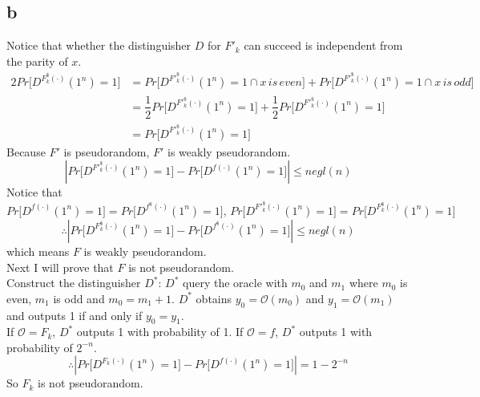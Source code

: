 \documentclass[a4papers]{ctexart}
\begin{document}
\subsection*{b}
\noindent Notice that whether the distinguisher $D$ for $F'_k$ can succeed is independent from the parity of $x$.
\begin{alignat*}{2}
    Pr\big[ D^{F^\$_k(·)}(1^n)=1\big] 
    &= Pr\big[ D^{F'^\$_k(·)}(1^n)=1 \cap x \,is\, even \big] + Pr\big[ D^{F'^\$_k(·)}(1^n)=1 \cap x \,is\, odd \big]\\
    &= \dfrac{1}{2} Pr\big[ D^{F'^\$_k(·)}(1^n)=1] + \dfrac{1}{2}Pr\big[ D^{F'^\$_k(·)}(1^n)=1]\\
    &= Pr\big[ D^{F'^\$_k(·)}(1^n)=1]
\end{alignat*}
Because $F'$ is pseudorandom, $F'$ is weakly pseudorandom.
\[ |Pr\big[ D^{F'^\$_k(·)}(1^n)=1] - Pr\big[ D^{f(·)}(1^n)=1\big]| \le negl(n) \]
Notice that \[Pr\big[ D^{f(·)}(1^n)=1\big] = Pr\big[ D^{f^\$(·)}(1^n)=1\big],\, 
Pr\big[ D^{F'^\$_k(·)}(1^n)=1] = Pr\big[ D^{F^\$_k(·)}(1^n)=1\big] \]
\[\therefore  |Pr\big[ D^{F^\$_k(·)}(1^n)=1] - Pr\big[ D^{f^\$(·)}(1^n)=1\big]| \le negl(n) \]
which means $F$ is weakly pseudorandom.\\
Next I will prove that $F$ is not pseudorandom.\\
Construct the distinguisher $D^*$: $D^*$ query the oracle with $m_0$ and $m_1$ where $m_0$ is even, $m_1$ is odd
 and $m_0 = m_1 + 1$. $D^*$ obtains $y_0 = \mathcal{O}(m_0)$ and $y_1 = \mathcal{O}(m_1)$ and outputs 1 if and only if
 $y_0 = y_1$. \\
 If $\mathcal{O} = F_k$, $D^*$ outputs 1 with probability of 1.
 If $\mathcal{O} = f$, $D^*$ outputs 1 with probability of $2^{-n}$. 
 \[ \therefore |Pr\big[ D^{F_k(·)}(1^n)=1] - Pr\big[ D^{f(·)}(1^n)=1\big]| = 1-2^{-n} \]
 So $F_k$ is not pseudorandom.
\end{document}
